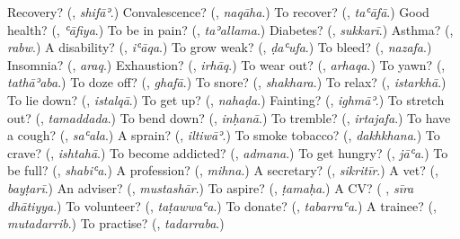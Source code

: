 \begin{tcolorbox}[breakable,colback=teal!4,colframe=teal!35!black,title={Before you move on}]
Recovery? (\textbf{}, \emph{shifāʾ}.) Convalescence? (\textbf{}, \emph{naqāha}.) To recover? (\textbf{}, \emph{taʿāfā}.) Good health? (\textbf{}, \emph{ʿāfiya}.) To be in pain? (\textbf{}, \emph{taʾallama}.) Diabetes? (\textbf{}, \emph{sukkarī}.) Asthma? (\textbf{}, \emph{rabw}.) A disability? (\textbf{}, \emph{iʿāqa}.) To grow weak? (\textbf{}, \emph{ḍaʿufa}.) To bleed? (\textbf{}, \emph{nazafa}.) Insomnia? (\textbf{}, \emph{araq}.) Exhaustion? (\textbf{}, \emph{irhāq}.) To wear out? (\textbf{}, \emph{arhaqa}.) To yawn? (\textbf{}, \emph{tathāʾaba}.) To doze off? (\textbf{}, \emph{ghafā}.) To snore? (\textbf{}, \emph{shakhara}.) To relax? (\textbf{}, \emph{istarkhā}.) To lie down? (\textbf{}, \emph{istalqā}.) To get up? (\textbf{}, \emph{nahaḍa}.) Fainting? (\textbf{}, \emph{ighmāʾ}.) To stretch out? (\textbf{}, \emph{tamaddada}.) To bend down? (\textbf{}, \emph{inḥanā}.) To tremble? (\textbf{}, \emph{irtajafa}.) To have a cough? (\textbf{}, \emph{saʿala}.) A sprain? (\textbf{}, \emph{iltiwāʾ}.) To smoke tobacco? (\textbf{}, \emph{dakhkhana}.) To crave? (\textbf{}, \emph{ishtahā}.) To become addicted? (\textbf{}, \emph{admana}.) To get hungry? (\textbf{}, \emph{jāʿa}.) To be full? (\textbf{}, \emph{shabiʿa}.) A profession? (\textbf{}, \emph{mihna}.) A secretary? (\textbf{}, \emph{sikritīr}.) A vet? (\textbf{}, \emph{bayṭarī}.) An adviser? (\textbf{}, \emph{mustashār}.) To aspire? (\textbf{}, \emph{ṭamaḥa}.) A CV? (\textbf{ }, \emph{sīra dhātiyya}.) To volunteer? (\textbf{}, \emph{taṭawwaʿa}.) To donate? (\textbf{}, \emph{tabarraʿa}.) A trainee? (\textbf{}, \emph{mutadarrib}.) To practise? (\textbf{}, \emph{tadarraba}.)
\end{tcolorbox}
